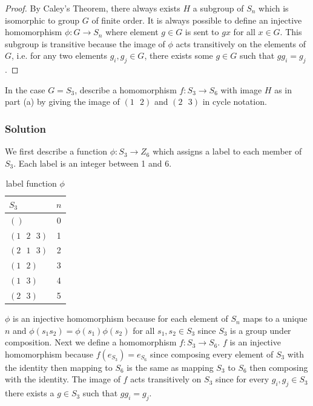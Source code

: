 \documentclass{article}
\theoremstyle{plain} %
\theoremstyle{definition} %
\begin{document}
\begin{proof}
    By Caley's Theorem, there always exists $H$ a subgroup of $S_n$ which is isomorphic
    to group $G$ of finite order. It is always possible to
    define an injective homomorphism $\phi: G \to S_n$ where element $g \in G$ is sent to $gx$ for all $x \in G$.
    This subgroup is transitive because the image of $\phi$ acts transitively on the elements of $G$, i.e.
    for any two elements $g_i,g_j \in G$, there exists some $g\in G$ such that $gg_i=g_j$.
\end{proof}


\noindent{} In the case $G=S_3$, describe a homomorphism $f:S_3 \to S_6$
with image $H$ as in part (a) by giving the image of $(1\text{ }2)$ and $(2\text{ }3)$
in cycle notation.


\noindent \subsubsection*{Solution}
We first describe a function $\phi: S_3 \to Z_6$ which assigns a label to each member of 
$S_3$. Each label is an integer between 1 and $6$.
\begin{table}[h!]
    \begin{center}
        \caption{label function $\phi$}
        \begin{tabular}{l|c}
            \textbf{$S_3$} & \textbf{$n$} \\
            \hline
            $()$ & 0 \\
            $(1\text{ }2\text{ }3)$ & 1\\
            $(2\text{ }1\text{ }3)$ & 2\\
            $(1\text{ }2)$ & 3\\
            $(1\text{ }3)$ & 4\\
            $(2\text{ }3)$ & 5\\
        \end{tabular}
    \end{center}
\end{table}

$\phi$ is an injective homomorphism because for each element of $S_n$ maps to a 
unique $n$ and $\phi(s_1s_2) = \phi(s_1)\phi(s_2)$ for all $s_1,s_2 \in S_3$ since $S_3$ is
a group under composition. Next we define a homomorphism $f: S_3 \to S_6$. $f$ is an injective homomorphism
because $f(e_{S_3}) = e_{S_6}$ since composing every element of $S_3$ with the identity then
mapping to $S_6$ is the same as mapping $S_3$ to $S_6$ then composing with the identity. The
image of $f$ acts transitively on $S_3$ since for every $g_i,g_j \in S_3$ there exists
a $g \in S_3$ such that $gg_i = g_j$.
\end{document}
